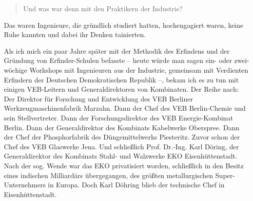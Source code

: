 \documentclass[11pt,a4paper]{article}
\newenvironment{frage}{\begin{quote}}{\end{quote}}
\begin{document}
\begin{frage}
  Und was war denn mit den Praktikern der Industrie?
\end{frage}
Das waren Ingenieure, die gründlich studiert hatten, hochengagiert waren,
keine Ruhe kannten und dabei ihr Denken tainierten.

Als ich mich ein paar Jahre später mit der Methodik des Erfindens und der
Gründung von Erfinder-Schulen befasste – heute würde man sagen ein- oder
zwei-wöchige Workshops mit Ingenieuren aus der Industrie, gemeinsam mit
Verdienten Erfindern der Deutschen Demokratischen Republik –, bekam ich es zu
tun mit einigen VEB-Leitern und Generaldirektoren von Kombinaten. Der Reihe
nach: Der Direktor für Forschung und Entwicklung des VEB Berliner
Werkzeugmaschinenfabrik Marzahn. Dann der Chef des VEB Berlin-Chemie und sein
Stellvertreter. Dann der Forschungsdirektor des VEB Energie-Kombinat
Berlin. Dann der Generaldirektor des Kombinats Kabelwerke Oberspree. Dann der
Chef der Phosphorfabrik des Düngemittelwerks Piesteritz. Zuvor schon der Chef
des VEB Glaswerke Jena. Und schließlich Prof. Dr.-Ing. Karl Döring, der
Generaldirektor des Kombinats Stahl- und Walzwerke EKO Eisenhüttenstadt. Nach
der sog. Wende war das EKO privatisiert worden, schließlich in den Besitz
eines indischen Milliardärs übergegangen, des größten metallurgischen
Super-Unternehmers in Europa. Doch Karl Döhring blieb der technische Chef in
Eisenhüttenstadt.
\vfill
\ccnotice
\end{document}
